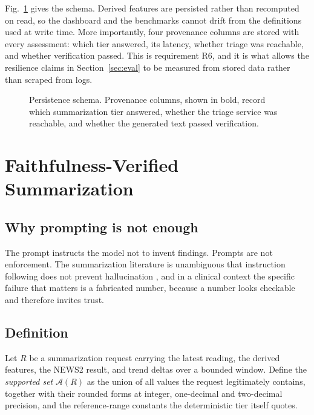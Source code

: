 \documentclass[lettersize,journal]{IEEEtran}
\begin{document}
Fig.~\ref{fig:schema} gives the schema. Derived features are persisted rather
than recomputed on read, so the dashboard and the benchmarks cannot drift from
the definitions used at write time. More importantly, four provenance columns
are stored with every assessment: which tier answered, its latency, whether
triage was reachable, and whether verification passed. This is requirement R6,
and it is what allows the resilience claims in Section~\ref{sec:eval} to be
measured from stored data rather than scraped from logs.

\begin{figure}[t]
\centering
\resizebox{\textwidth}{!}{}
\caption{Persistence schema. Provenance columns, shown in bold, record which
summarization tier answered, whether the triage service was reachable, and
whether the generated text passed verification.}
\label{fig:schema}
\end{figure}

\section{Faithfulness-Verified Summarization}
\label{sec:faith}

\subsection{Why prompting is not enough}

The prompt instructs the model not to invent findings. Prompts are not
enforcement. The summarization literature is unambiguous that instruction
following does not prevent hallucination \cite{huang2025, ji2023}, and in a
clinical context the specific failure that matters is a fabricated number,
because a number looks checkable and therefore invites trust.

\subsection{Definition}

Let $R$ be a summarization request carrying the latest reading, the derived
features, the NEWS2 result, and trend deltas over a bounded window. Define the
\emph{supported set} $\mathcal{A}(R)$ as the union of all values the request
legitimately contains, together with their rounded forms at integer, one-decimal
and two-decimal precision, and the reference-range constants the deterministic
tier itself quotes.
\end{document}
